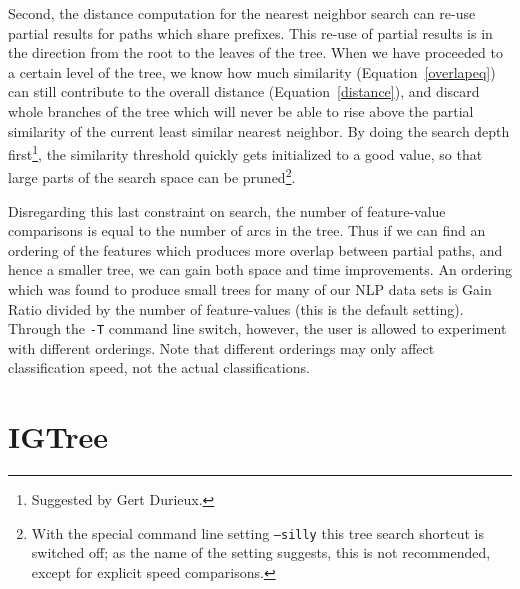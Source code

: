 \documentclass{report}
\begin{document}
Second, the distance computation for the nearest neighbor search can
re-use partial results for paths which share prefixes.  This re-use of
partial results is in the direction from the root to the leaves of the
tree. When we have proceeded to a certain level of the tree, we know
how much similarity (Equation~\ref{overlapeq}) can still contribute to
the overall distance (Equation~\ref{distance}), and discard whole
branches of the tree which will never be able to rise above the
partial similarity of the current least similar nearest neighbor. By
doing the search depth first\footnote{Suggested by Gert Durieux.}, the
similarity threshold quickly gets initialized to a good value, so that
large parts of the search space can be pruned\footnote{With the
  special command line setting {\tt --silly} this tree search shortcut
  is switched off; as the name of the setting suggests, this is not
  recommended, except for explicit speed comparisons.}.

Disregarding this last constraint on search, the number of
feature-value comparisons is equal to the number of arcs in the
tree. Thus if we can find an ordering of the features which produces
more overlap between partial paths, and hence a smaller tree, we can
gain both space and time improvements. An ordering which was found to
produce small trees for many of our NLP data sets is Gain Ratio
divided by the number of feature-values (this is the default
setting). Through the {\tt -T} command line switch, however, the user
is allowed to experiment with different orderings. Note that different
orderings may only affect classification speed, not the actual
classifications.

\section{IGTree}
\label{igtree}
\end{document}
